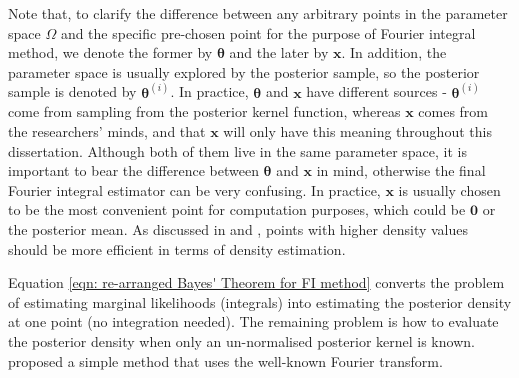 \documentclass[%
 reprint,
 amsmath,amssymb,
 aps,
]{revtex4-2}
\def\btheta{\boldsymbol{\theta}}
\def\xbold{\mathbf{x}}
\begin{document}
Note that, to clarify the difference between any arbitrary points in the parameter space $\Omega$ and the specific pre-chosen point for the purpose of Fourier integral method, we denote the former by $\btheta$ and the later by $\xbold$. In addition, the parameter space is usually explored by the posterior sample, so the posterior sample is denoted by $\btheta^{(i)}$. In practice, $\btheta$ and $\xbold$ have different sources - $\btheta^{(i)}$ come from sampling from the posterior kernel function, whereas $\xbold$ comes from the researchers' minds, and that $\xbold$ will only have this meaning throughout this dissertation. Although both of them live in the same parameter space, it is important to bear the difference between $\btheta$ and $\xbold$ in mind, otherwise the final Fourier integral estimator can be very confusing. In practice, $\xbold$ is usually chosen to be the most convenient point for computation purposes, which could be $\mathbf{0}$ or the posterior mean. As discussed in \cite{chib1995marginal} and \cite{chib2001marginal}, points with higher density values should be more efficient in terms of density estimation.

Equation \eqref{eqn: re-arranged Bayes' Theorem for FI method} converts the problem of estimating marginal likelihoods (integrals) into estimating the posterior density at one point (no integration needed). The remaining problem is how to evaluate the posterior density when only an un-normalised posterior kernel is known. \cite{rotiroti2022computing} proposed a simple method that uses the well-known Fourier transform.
\end{document}
